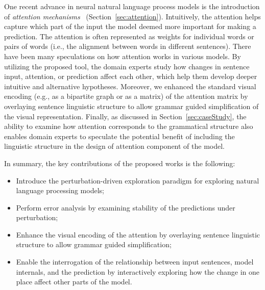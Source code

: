 One recent advance in neural natural language process models is the introduction of \emph{attention mechanisms}~\cite{VaswaniShazeerParmar2017} (Section~\ref{sec:attention}). Intuitively, the attention helps capture which part of the input the model deemed more important for making a prediction. The attention is often represented as weights for individual words or pairs of words (i.e., the alignment between words in different sentences).
%
There have been many speculations on how attention works in various models. By utilizing the proposed tool, the domain experts study how changes in sentence input, attention, or prediction affect each other, which help them develop deeper intuitive and alternative hypotheses. 
Moreover, we enhanced the standard visual encoding (e.g., as a bipartite graph or as a matrix) of the attention matrix by overlaying sentence linguistic structure to allow grammar guided simplification of the visual representation.
%
Finally, as discussed in Section~\ref{sec:caseStudy}, the ability to examine how attention corresponds to the grammatical structure also enables domain experts to speculate the potential benefit of including the linguistic structure in the design of attention component of the model.

In summary, the key contributions of the proposed works is the following:
\begin{itemize}
    \item Introduce the perturbation-driven exploration paradigm for exploring natural language processing models;

    \item Perform error analysis by examining stability of the predictions under perturbation;

    \item Enhance the visual encoding of the attention by overlaying sentence linguistic structure to allow grammar guided simplification;

    \item Enable the interrogation of the relationship between input sentences, model internals, and the prediction by interactively exploring how the change in one place affect other parts of the model.
\end{itemize}
%

